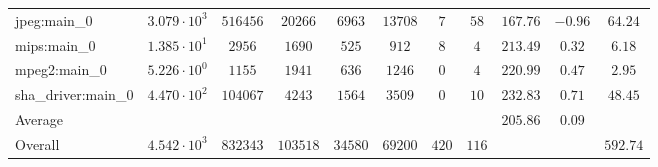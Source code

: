 \begin{tabular}{|l|c|c|c|c|c|c|c|c|c|c|}
jpeg:main\_0            & $ 3.079 \cdot 10^{3}  $ & $ 516456 $ & $ 20266  $ & $ 6963  $ & $ 13708 $ & $ 7   $ & $ 58  $ & $ 167.76      $ & $ -0.96   $ & $ 64.24   $ \\
mips:main\_0            & $ 1.385 \cdot 10^{1}  $ & $ 2956   $ & $ 1690   $ & $ 525   $ & $ 912   $ & $ 8   $ & $ 4   $ & $ 213.49      $ & $ 0.32    $ & $ 6.18    $ \\
mpeg2:main\_0           & $ 5.226 \cdot 10^{0}  $ & $ 1155   $ & $ 1941   $ & $ 636   $ & $ 1246  $ & $ 0   $ & $ 4   $ & $ 220.99      $ & $ 0.47    $ & $ 2.95    $ \\
sha\_driver:main\_0     & $ 4.470 \cdot 10^{2}  $ & $ 104067 $ & $ 4243   $ & $ 1564  $ & $ 3509  $ & $ 0   $ & $ 10  $ & $ 232.83      $ & $ 0.71    $ & $ 48.45   $ \\
\hline
Average                 & $                     $ & $        $ & $        $ & $       $ & $       $ & $     $ & $     $ & $ 205.86      $ & $ 0.09    $ & $         $ \\
\hline
Overall                 & $ 4.542 \cdot 10^{3}  $ & $ 832343 $ & $ 103518 $ & $ 34580 $ & $ 69200 $ & $ 420 $ & $ 116 $ & $             $ & $         $ & $ 592.74  $ \\
\hline
\end{tabular}
